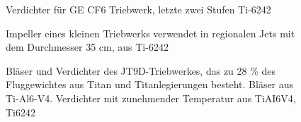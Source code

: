 \begin{figure}
	\centering
	\caption{Verdichter für GE CF6 Triebwerk, letzte zwei Stufen Ti-6242}
	\caption{Impeller eines kleinen Triebwerks verwendet in regionalen Jets mit dem Durchmesser 35 cm, aus Ti-6242}
	\caption{Bläser und Verdichter des JT9D-Triebwerkes, das zu 28 \% des Fluggewichtes aus
		Titan und Titanlegierungen besteht. Bläser aus Ti-Al6-V4. Verdichter mit zunehmender Temperatur aus TiAI6V4, Ti6242}
	\label{Verwend}
\end{figure}


